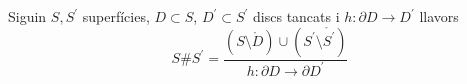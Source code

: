 \begin{defi}
    Siguin $S, S^\prime$ superfícies, $D \subset S$, $D^\prime \subset S^\prime$ discs tancats i
    $h \colon \partial D \to D^\prime$ llavors
    \[
	S \# S^\prime = \frac{\left(S \setminus \mathring{D} \right) \cup 
	\left( S^\prime \setminus \mathring{S^\prime} \right)}{h \colon \partial D \to \partial D^\prime}
    \]
\end{defi}
